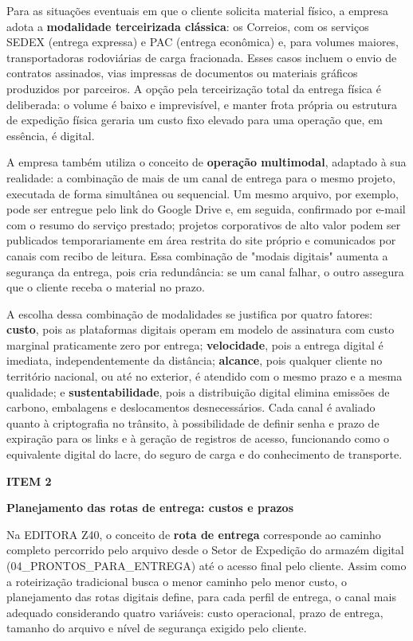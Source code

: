 \documentclass[10pt,a4paper]{article}
\newcommand{\labelfont}{\fontsize{5.8}{7.5}\selectfont\bfseries\addfontfeatures{LetterSpace=15}}
\newcommand{\headingfont}{\fontsize{9.8}{12}\selectfont\bfseries\color{navy}}
\newcommand{\separador}{\vspace{16pt}{\color{rulegray}\rule{\linewidth}{0.6pt}}\vspace{10pt}}
\newcommand{\itemh}[2]{\needspace{6\baselineskip}%
  {\labelfont\color{graylab}ITEM #1}\par\vspace{5pt}%
  {\headingfont #2}\par\vspace{8pt}}
\begin{document}
Para as situações eventuais em que o cliente solicita material físico, a empresa adota a \textbf{modalidade terceirizada clássica}: os Correios, com os serviços SEDEX (entrega expressa) e PAC (entrega econômica) e, para volumes maiores, transportadoras rodoviárias de carga fracionada. Esses casos incluem o envio de contratos assinados, vias impressas de documentos ou materiais gráficos produzidos por parceiros. A opção pela terceirização total da entrega física é deliberada: o volume é baixo e imprevisível, e manter frota própria ou estrutura de expedição física geraria um custo fixo elevado para uma operação que, em essência, é digital.

A empresa também utiliza o conceito de \textbf{operação multimodal}, adaptado à sua realidade: a combinação de mais de um canal de entrega para o mesmo projeto, executada de forma simultânea ou sequencial. Um mesmo arquivo, por exemplo, pode ser entregue pelo link do Google Drive e, em seguida, confirmado por e-mail com o resumo do serviço prestado; projetos corporativos de alto valor podem ser publicados temporariamente em área restrita do site próprio e comunicados por canais com recibo de leitura. Essa combinação de "modais digitais" aumenta a segurança da entrega, pois cria redundância: se um canal falhar, o outro assegura que o cliente receba o material no prazo.

A escolha dessa combinação de modalidades se justifica por quatro fatores: \textbf{custo}, pois as plataformas digitais operam em modelo de assinatura com custo marginal praticamente zero por entrega; \textbf{velocidade}, pois a entrega digital é imediata, independentemente da distância; \textbf{alcance}, pois qualquer cliente no território nacional, ou até no exterior, é atendido com o mesmo prazo e a mesma qualidade; e \textbf{sustentabilidade}, pois a distribuição digital elimina emissões de carbono, embalagens e deslocamentos desnecessários. Cada canal é avaliado quanto à criptografia no trânsito, à possibilidade de definir senha e prazo de expiração para os links e à geração de registros de acesso, funcionando como o equivalente digital do lacre, do seguro de carga e do conhecimento de transporte.

\separador
\itemh{2}{Planejamento das rotas de entrega: custos e prazos}

Na EDITORA Z40, o conceito de \textbf{rota de entrega} corresponde ao caminho completo percorrido pelo arquivo desde o Setor de Expedição do armazém digital (04\_PRONTOS\_\allowbreak PARA\_\allowbreak ENTREGA) até o acesso final pelo cliente. Assim como a roteirização tradicional busca o menor caminho pelo menor custo, o planejamento das rotas digitais define, para cada perfil de entrega, o canal mais adequado considerando quatro variáveis: custo operacional, prazo de entrega, tamanho do arquivo e nível de segurança exigido pelo cliente.
\end{document}
